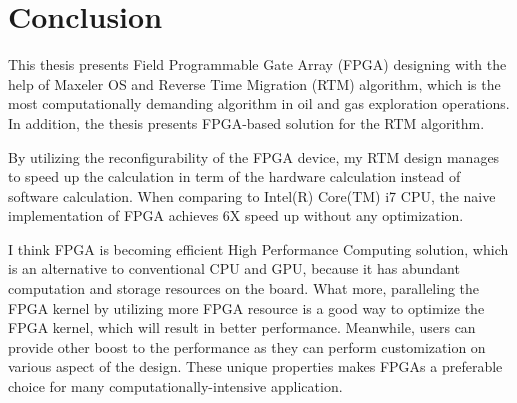\section{Conclusion} %
\label{sec:Conclusion}

This thesis presents Field Programmable Gate Array (FPGA) designing with 
the help of Maxeler OS and Reverse Time Migration (RTM) algorithm, which is 
the most computationally demanding algorithm in oil and gas exploration 
operations. In addition, the thesis presents FPGA-based solution for the 
RTM algorithm.

By utilizing the reconfigurability of the FPGA device, my RTM design 
manages to speed up the calculation in term of the hardware calculation 
instead of software calculation. When comparing to Intel(R) Core(TM) i7 
CPU, the naive implementation of FPGA achieves 6X speed up without any 
optimization. 

I think FPGA is becoming efficient High Performance Computing solution, 
which is an alternative to conventional CPU and GPU, because it has 
abundant computation and storage resources on the board. What more, 
paralleling the FPGA kernel by utilizing more FPGA resource is a good way to 
optimize the FPGA kernel, which will result in better performance. 
Meanwhile, users can provide other boost to the performance as they can 
perform customization on various aspect of the design. These unique 
properties makes FPGAs a preferable choice for many 
computationally-intensive application.


